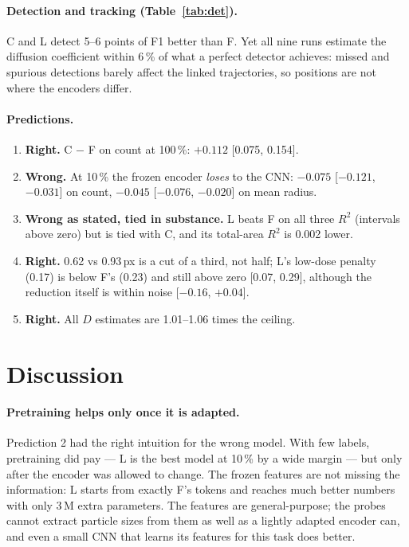 \documentclass[11pt,a4paper]{article}
\newcommand{\F}{\textsf{F}}
\newcommand{\C}{\textsf{C}}
\newcommand{\Lo}{\textsf{L}}
\begin{document}
\paragraph{Detection and tracking (Table~\ref{tab:det}).} \C{} and \Lo{} detect 5--6
points of F1 better than \F{}. Yet all nine runs estimate the diffusion coefficient
within 6\,\% of what a perfect detector achieves: missed and spurious detections barely
affect the linked trajectories, so positions are not where the encoders differ.

\paragraph{Predictions.}
\begin{enumerate}
  \item \textbf{Right.} \C{} $-$ \F{} on count at 100\,\%: $+0.112$ [0.075, 0.154].
  \item \textbf{Wrong.} At 10\,\% the frozen encoder \emph{loses} to the CNN: $-0.075$
        [$-0.121$, $-0.031$] on count, $-0.045$ [$-0.076$, $-0.020$] on mean radius.
  \item \textbf{Wrong as stated, tied in substance.} \Lo{} beats \F{} on all three
        $R^2$ (intervals above zero) but is tied with \C{}, and its total-area $R^2$ is
        0.002 lower.
  \item \textbf{Right.} 0.62 vs 0.93\,px is a cut of a third, not half; \Lo{}'s low-dose
        penalty (0.17) is below \F{}'s (0.23) and still above zero [0.07, 0.29], although
        the reduction itself is within noise [$-0.16$, $+0.04$].
  \item \textbf{Right.} All $D$ estimates are 1.01--1.06 times the ceiling.
\end{enumerate}

\section{Discussion}

\paragraph{Pretraining helps only once it is adapted.} Prediction 2 had the right
intuition for the wrong model. With few labels, pretraining did pay --- \Lo{} is the best
model at 10\,\% by a wide margin --- but only after the encoder was allowed to change. The
frozen features are not missing the information: \Lo{} starts from exactly \F{}'s tokens
and reaches much better numbers with only 3\,M extra parameters. The features are
general-purpose; the probes cannot extract particle sizes from them as well as a lightly
adapted encoder can, and even a small CNN that learns its features for this task does
better.
\end{document}
